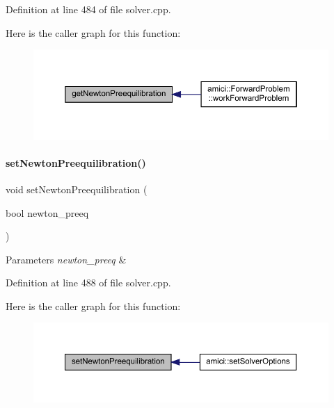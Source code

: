 Definition at line 484 of file solver.\+cpp.

Here is the caller graph for this function\+:
\nopagebreak
\begin{figure}[H]
\begin{center}
\leavevmode
\includegraphics[width=350pt]{classamici_1_1_solver_a75aabe2e004edaba96db48b0abd3fc6f_icgraph}
\end{center}
\end{figure}
\mbox{\label{classamici_1_1_solver_a8e71a26a59a4c3c03b362a72079377f2}} 
\paragraph{\texorpdfstring{set\+Newton\+Preequilibration()}{setNewtonPreequilibration()}}
{\footnotesize\ttfamily void set\+Newton\+Preequilibration (\begin{DoxyParamCaption}\item[{bool}]{newton\+\_\+preeq }\end{DoxyParamCaption})}


\begin{DoxyParams}{Parameters}
{\em newton\+\_\+preeq} & \\
\hline
\end{DoxyParams}


Definition at line 488 of file solver.\+cpp.

Here is the caller graph for this function\+:
\nopagebreak
\begin{figure}[H]
\begin{center}
\leavevmode
\includegraphics[width=350pt]{classamici_1_1_solver_a8e71a26a59a4c3c03b362a72079377f2_icgraph}
\end{center}
\end{figure}
\mbox{\label{classamici_1_1_solver_a874c929a78d0e2af11c62ba958e1b3d1}} 
